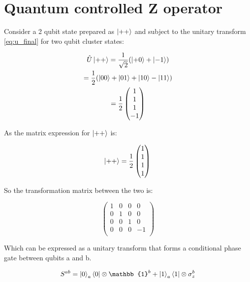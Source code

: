 \section{Quantum controlled Z operator}

Consider a 2 qubit state prepared as $\ket{+ +}$ and subject to the unitary transform \eqref{eq:u_final} for two qubit cluster states:

\begin{multline*}
\hat{U} \ket{+ +} = \frac{1}{\sqrt{2}} (\ket{+ 0} + \ket{- 1}) \\
=  \frac{1}{2} (\ket{0 0} + \ket{0 1} + \ket{1 0} - \ket{1 1}) \\
= \frac{1}{2} \begin{pmatrix}
1 \\
1 \\
1 \\
-1
\end{pmatrix} \\
\end{multline*}

As the matrix expression for $\ket{+ +}$ is:

\begin{equation}
\ket{+ +} = 
\frac{1}{2} \begin{pmatrix}
1 \\
1 \\
1 \\
1
\end{pmatrix} \\
\end{equation}

So the transformation matrix between the two is:

\begin{equation}
\begin{pmatrix}
1 & 0 & 0 & 0 \\
0 & 1 & 0 & 0 \\
0 & 0 & 1 & 0 \\
0 & 0 & 0 & -1 \\
\end{pmatrix}
\end{equation}

Which can be expressed as a unitary transform that forms a conditional phase gate between qubits a and b.

\begin{equation}
S^{ab} = \ket{0}_{a} \bra{0} \otimes \mathbb{1}^{b} + \ket{1}_{a} \bra{1} \otimes \sigma_{z}^{b}
\end{equation}

